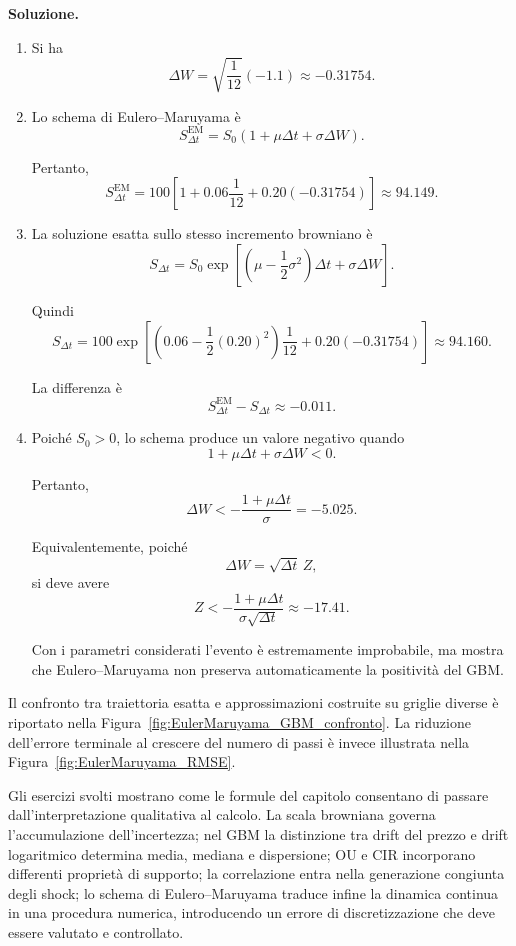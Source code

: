 \noindent
\textbf{Soluzione.}

\begin{enumerate}

\item Si ha
\[
\Delta W
=
\sqrt{\frac{1}{12}}(-1.1)
\approx
-0.31754.
\]

\item Lo schema di Eulero--Maruyama \`{e}
\[
S_{\Delta t}^{\mathrm{EM}}
=
S_0
\left(
1+\mu\Delta t+\sigma\Delta W
\right).
\]

Pertanto,
\[
S_{\Delta t}^{\mathrm{EM}}
=
100
\left[
1+0.06\frac{1}{12}
+0.20(-0.31754)
\right]
\approx
94.149.
\]

\item La soluzione esatta sullo stesso incremento browniano \`{e}
\[
S_{\Delta t}
=
S_0
\exp\left[
\left(
\mu-\frac{1}{2}\sigma^2
\right)\Delta t
+\sigma\Delta W
\right].
\]

Quindi
\[
S_{\Delta t}
=
100
\exp\left[
\left(
0.06-\frac{1}{2}(0.20)^2
\right)\frac{1}{12}
+0.20(-0.31754)
\right]
\approx
94.160.
\]

La differenza \`{e}
\[
S_{\Delta t}^{\mathrm{EM}}-S_{\Delta t}
\approx
-0.011.
\]

\item Poich\'{e} $S_0>0$, lo schema produce un valore negativo quando
\[
1+\mu\Delta t+\sigma\Delta W<0.
\]

Pertanto,
\[
\Delta W
<
-
\frac{1+\mu\Delta t}{\sigma}
=
-5.025.
\]

Equivalentemente, poich\'{e}
\[
\Delta W=\sqrt{\Delta t}\,Z,
\]
si deve avere
\[
Z
<
-
\frac{1+\mu\Delta t}
{\sigma\sqrt{\Delta t}}
\approx
-17.41.
\]

Con i parametri considerati l'evento \`{e} estremamente improbabile,
ma mostra che Eulero--Maruyama non preserva automaticamente la
positivit\`{a} del GBM.

\end{enumerate}

Il confronto tra traiettoria esatta e approssimazioni costruite su
griglie diverse \`{e} riportato nella
Figura~\ref{fig:EulerMaruyama_GBM_confronto}. La riduzione dell'errore
terminale al crescere del numero di passi \`{e} invece illustrata nella
Figura~\ref{fig:EulerMaruyama_RMSE}.

Gli esercizi svolti mostrano come le formule del capitolo consentano di
passare dall'interpretazione qualitativa al calcolo. La scala browniana
governa l'accumulazione dell'incertezza; nel GBM la distinzione tra
drift del prezzo e drift logaritmico determina media, mediana e
dispersione; OU e CIR incorporano differenti propriet\`{a} di supporto;
la correlazione entra nella generazione congiunta degli shock; lo schema
di Eulero--Maruyama traduce infine la dinamica continua in una procedura
numerica, introducendo un errore di discretizzazione che deve essere
valutato e controllato.

